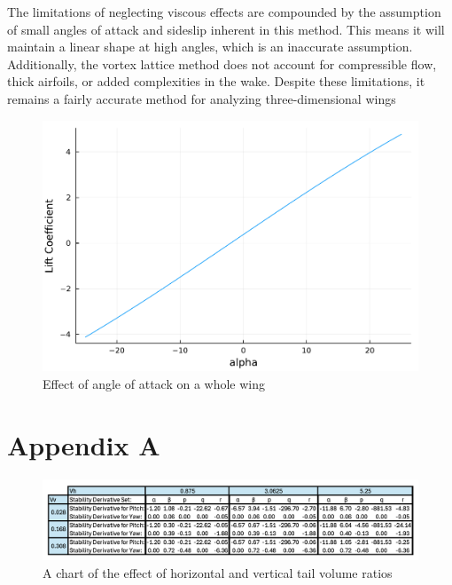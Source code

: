 \documentclass{article}
\begin{document}
The limitations of neglecting viscous effects are compounded by the assumption of small angles of attack and sideslip inherent in this method. This means it will maintain a linear shape at high angles, which is an inaccurate assumption. Additionally, the vortex lattice method does not account for compressible flow, thick airfoils, or added complexities in the wake. Despite these limitations, it remains a fairly accurate method for analyzing three-dimensional wings

\begin{figure}[h]
\centering
\includegraphics[width=.55\linewidth]{Lift Coefficient vs Angle of Attack.pdf}
\caption{\label{fig:lift angle} Effect of angle of attack on a whole wing}
\end{figure}

%
%

\clearpage
\appendix
\chapter{Appendix A}

\begin{figure}[h]
\centering
\includegraphics[width=.55\linewidth]{Complete Chart.png}
\caption{\label{fig:Complete Chart} A chart of the effect of horizontal and vertical tail volume ratios}
\end{figure}
\end{document}
